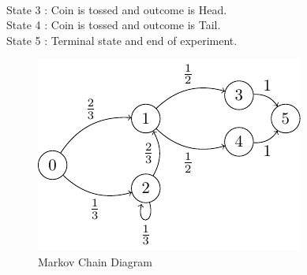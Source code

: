 \documentclass[journal,12pt,twocolumn]{IEEEtran}
\begin{document}
\\ State 3 : Coin is tossed and outcome is Head.
\\ State 4 : Coin is tossed and outcome is Tail.
\\ State 5 : Terminal state and end of experiment.
\begin{figure}
\centering
\includegraphics[width=\columnwidth]{./Figure/figure.pdf}
\caption { Markov Chain Diagram }
\end{figure}
\end{document}
